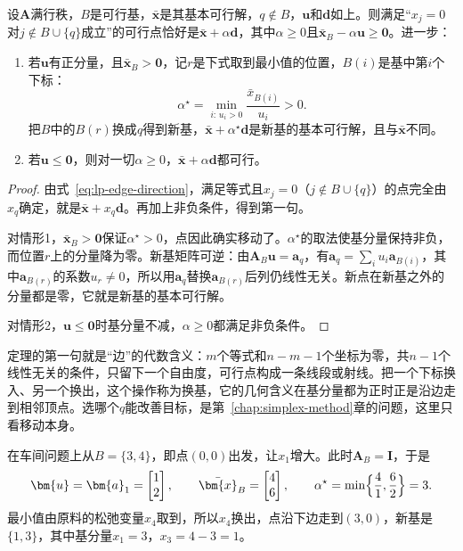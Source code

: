 \begin{theorem}[沿边的移动]
 \label{thm:lp-edge-move}
 设$\bm{A}$满行秩，$B$是可行基，$\bar{\bm{x}}$是其基本可行解，$q\notin B$，$\bm{u}$和$\bm{d}$如上。则满足“$x_j=0$对$j\notin B\cup\{q\}$成立”的可行点恰好是$\bar{\bm{x}}+\alpha\bm{d}$，其中$\alpha\geq0$且$\bar{\bm{x}}_B-\alpha\bm{u}\geq\bm{0}$。进一步：
 \begin{enumerate}
  \item 若$\bm{u}$有正分量，且$\bar{\bm{x}}_B>\bm{0}$，记$r$是下式取到最小值的位置，$B(i)$是基中第$i$个下标：
  \begin{equation}
   \alpha^\star=\min_{i:\,u_i>0}\frac{\bar{x}_{B(i)}}{u_i}>0.
   \label{eq:lp-edge-step}
  \end{equation}
  把$B$中的$B(r)$换成$q$得到新基，$\bar{\bm{x}}+\alpha^\star\bm{d}$是新基的基本可行解，且与$\bar{\bm{x}}$不同。
  \item 若$\bm{u}\leq\bm{0}$，则对一切$\alpha\geq0$，$\bar{\bm{x}}+\alpha\bm{d}$都可行。
 \end{enumerate}
\end{theorem}

\begin{proof}
 由式~\eqref{eq:lp-edge-direction}，满足等式且$x_j=0$（$j\notin B\cup\{q\}$）的点完全由$x_q$确定，就是$\bar{\bm{x}}+x_q\bm{d}$。再加上非负条件，得到第一句。

 对情形1，$\bar{\bm{x}}_B>\bm{0}$保证$\alpha^\star>0$，点因此确实移动了。$\alpha^\star$的取法使基分量保持非负，而位置$r$上的分量降为零。新基矩阵可逆：由$\bm{A}_B\bm{u}=\bm{a}_q$，有$\bm{a}_q=\sum_iu_i\bm{a}_{B(i)}$，其中$\bm{a}_{B(r)}$的系数$u_r\neq0$，所以用$\bm{a}_q$替换$\bm{a}_{B(r)}$后列仍线性无关。新点在新基之外的分量都是零，它就是新基的基本可行解。

 对情形2，$\bm{u}\leq\bm{0}$时基分量不减，$\alpha\geq0$都满足非负条件。
\end{proof}

定理的第一句就是“边”的代数含义：$m$个等式和$n-m-1$个坐标为零，共$n-1$个线性无关的条件，只留下一个自由度，可行点构成一条线段或射线。把一个下标换入、另一个换出，这个操作称为换基，它的几何含义在基分量都为正时正是沿边走到相邻顶点。选哪个$q$能改善目标，是第~\ref{chap:simplex-method}章的问题，这里只看移动本身。

在车间问题上从$B=\{3,4\}$，即点$(0,0)$出发，让$x_1$增大。此时$\bm{A}_B=\bm{I}$，于是
\[
 \bm{u}=\bm{a}_1=\begin{bmatrix}1\\2\end{bmatrix},\qquad
 \bar{\bm{x}}_B=\begin{bmatrix}4\\6\end{bmatrix},\qquad
 \alpha^\star=\min\Bigl\{\frac41,\frac62\Bigr\}=3.
\]
最小值由原料的松弛变量$x_4$取到，所以$x_4$换出，点沿下边走到$(3,0)$，新基是$\{1,3\}$，其中基分量$x_1=3$，$x_3=4-3=1$。

